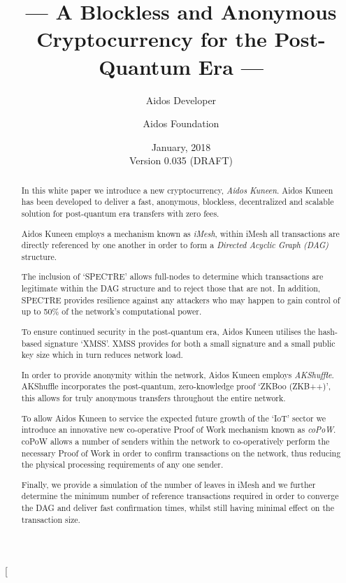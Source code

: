 \documentclass[a4paper,10pt,twocolumn]{article}
\title{--- A Blockless and Anonymous Cryptocurrency for the Post-Quantum Era ---}
\author{
		Aidos Developer \and Aidos Foundation
	}
\date{January, 2018 \\ Version 0.035 (DRAFT)}
\begin{document}
	
	\twocolumn[
		\maketitle
	
	\begin{abstract}
			In this white paper we introduce a new cryptocurrency, \emph{Aidos Kuneen}. Aidos Kuneen has been developed to deliver 
			a fast, anonymous, blockless, decentralized and scalable solution for post-quantum era transfers with zero fees. 
	
	\vspace{2.5mm}
			
			Aidos Kuneen employs a mechanism known as \emph{iMesh}, within iMesh all transactions are directly referenced by
			one another in order to form a \emph{Directed Acyclic Graph (DAG)} structure.
	
	\vspace{2.5mm}
			
			The inclusion of `SPECTRE' allows full-nodes to determine which transactions are legitimate within the DAG structure 
			and to reject those that are not. In addition, SPECTRE provides resilience against any attackers who may happen to gain 
			control of up to 50\% of the network's computational power.
	
	\vspace{2.5mm}
			
			To ensure continued security in the post-quantum era, Aidos Kuneen utilises the hash-based signature `XMSS'. XMSS
			provides for both a small signature and a small public key size which in turn reduces network load.
	
	\vspace{2.5mm}
		
			In order to provide anonymity within the network, Aidos Kuneen employs \emph{AKShuffle}. AKShuffle 	
			incorporates the post-quantum, zero-knowledge proof `ZKBoo (ZKB++)', this allows for truly anonymous transfers 
			throughout the entire network.
	
	\vspace{2.5mm}
			
			To allow Aidos Kuneen to service the expected future growth of the `IoT' sector we introduce an innovative new 
			co-operative Proof of Work mechanism known as \emph{coPoW}\@. coPoW allows a number of senders within the network to 
			co-operatively perform the necessary Proof of Work in order to confirm transactions on the network, thus reducing 
			the physical processing requirements of any one sender.
	
	\vspace{2.5mm}
	
			Finally, we provide a simulation of the number of leaves in iMesh and we further determine the minimum number of 
			reference transactions required in order to converge the DAG and deliver fast confirmation times, whilst still having minimal effect on the transaction size.
			
			\end{abstract}
	
\end{document}
